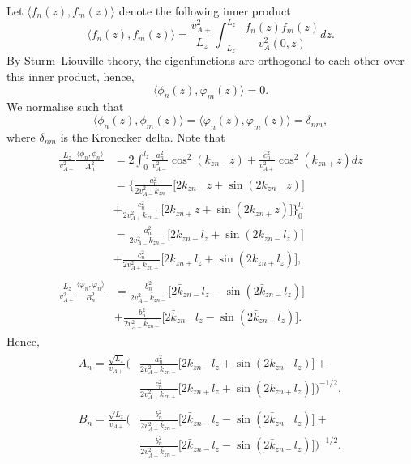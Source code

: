 Let $\Big\langle f_n(z), f_m(z) \Big\rangle$ denote the following inner product
\begin{equation}
    \Big\langle f_n(z), f_m(z) \Big\rangle = \frac{v_{A+}^2}{L_z}\int_{-L_z}^{L_z} \frac{f_n(z)f_m(z)}{v_A^2(0,z)}dz.
\end{equation}
By Sturm–Liouville theory, the eigenfunctions are orthogonal to each other over this inner product, hence,
\begin{equation}
    \Big\langle \phi_n(z), \varphi_m(z) \Big\rangle = 0.
\end{equation}
We normalise such that
\begin{equation}
    \Big\langle \phi_n(z), \phi_m(z) \Big\rangle = \Big\langle \varphi_n(z), \varphi_m(z) \Big\rangle = \delta_{nm},
\end{equation}
where $\delta_{nm}$ is the Kronecker delta.
Note that
\begin{gather}
    \begin{aligned}
    \frac{L_z}{v_{A+}^2}\frac{\langle \phi_n, \phi_n \rangle}{A_n^2} &= 2\int_{0}^{l_z} \frac{a_n^2}{v_{A-}^2}\cos^2(k_{zn-}z) + \frac{c_n^2}{v_{A+}^2}\cos^2(k_{zn+}z)dz \\
    &=\Bigg\{\frac{a_n^2}{2v_{A-}^2k_{zn-}}\Big[2k_{zn-}z+\sin(2k_{zn-}z)\Big]\\
    &+\frac{c_n^2}{2v_{A+}^2k_{zn+}}\Big[2k_{zn+}z+\sin(2k_{zn+}z)\Big]\Bigg\}_0^{l_z} \\
    &=\frac{a_n^2}{2v_{A-}^2k_{zn-}}\Big[2k_{zn-}l_z+\sin(2k_{zn-}l_z)\Big] \\
    &+\frac{c_n^2}{2v_{A+}^2k_{zn+}}\Big[2k_{zn+}l_z+\sin(2k_{zn+}l_z)\Big],
    \end{aligned} \\
    \begin{aligned}
    \frac{L_z}{v_{A+}^2}\frac{\langle \varphi_n, \varphi_n \rangle}{B_n^2} &=
    \frac{b_n^2}{2v_{A-}^2\bar{k}_{zn-}}\Big[2\bar{k}_{zn-}l_z-\sin(2\bar{k}_{zn-}l_z)\Big]\\
    &+ \frac{b_n^2}{2v_{A-}^2\bar{k}_{zn-}}\Big[2\bar{k}_{zn-}l_z-\sin(2\bar{k}_{zn-}l_z)\Big].
    \end{aligned}
\end{gather}
Hence,
\begin{gather}
    \begin{aligned}
    A_n = \frac{\sqrt{L_z}}{v_{A+}}\Bigg(&\frac{a_n^2}{2v_{A-}^2k_{zn-}}\Big[2k_{zn-}l_z+\sin(2k_{zn-}l_z)\Big] + \\
    &\frac{c_n^2}{2v_{A+}^2k_{zn+}}\Big[2k_{zn+}l_z+\sin(2k_{zn+}l_z)\Big] \Bigg)^{-1/2},
    \end{aligned} \\
    \begin{aligned}
    B_n = \frac{\sqrt{L_z}}{v_{A+}}\Bigg(&\frac{b_n^2}{2v_{A-}^2\bar{k}_{zn-}}\Big[2\bar{k}_{zn-}l_z-\sin(2\bar{k}_{zn-}l_z)\Big] + \\
    & \frac{b_n^2}{2v_{A-}^2\bar{k}_{zn-}}\Big[2\bar{k}_{zn-}l_z-\sin(2\bar{k}_{zn-}l_z)\Big] \Bigg)^{-1/2}.
    \end{aligned}
\end{gather}

